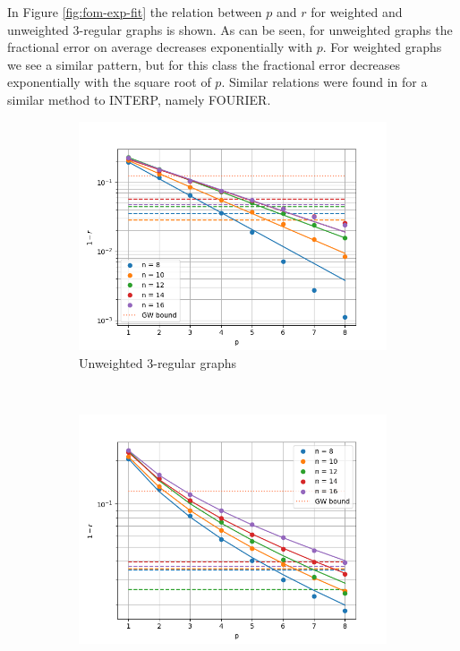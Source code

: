 In Figure \ref{fig:fom-exp-fit} the relation between $p$ and $r$ for weighted and unweighted 3-regular graphs is shown. As can be seen, for unweighted graphs the fractional error on average decreases exponentially with $p$. For weighted graphs we see a similar pattern, but for this class the fractional error decreases exponentially with the square root of $p$. Similar relations were found in \cite{ZWCPL18} for a similar method to INTERP, namely FOURIER.

\begin{figure}[H]
	\centering
	\begin{subfigure}[t]{0.65\textwidth}
		\centering
		\includegraphics[width=\textwidth]{figures/interp/FOM_(unweighted)/system-size_unweighted_exp.png}
		\captionsetup{justification=centering}
		\caption{Unweighted 3-regular graphs}
	\end{subfigure}
	\\
	\centering
	\begin{subfigure}[t]{0.65\textwidth}
		\centering
		\includegraphics[width=\textwidth]{figures/interp/FOM_(weighted)/SQR/system-size_sqr.png}

\end{subfigure}
\end{figure}
